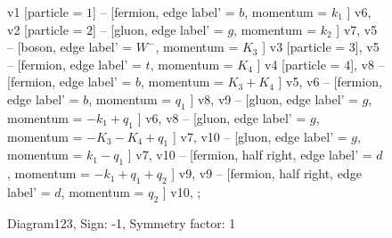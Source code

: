 \documentclass{revtex4}
\begin{document}
\begin{figure}[!htb]
\begin{center}
{    %
v1 [particle = \(1\)] -- [fermion, edge label' = \(b\), momentum = \(k_{1}\) ] v6, 
v2 [particle = \(2\)] -- [gluon, edge label' = \(g\), momentum = \(k_{2}\) ] v7, 
v5 -- [boson, edge label' = \(W^{-}\), momentum = \(K_{3}\) ] v3 [particle = \(3\)], 
v5 -- [fermion, edge label' = \(t\), momentum = \(K_{4}\) ] v4 [particle = \(4\)], 
v8 -- [fermion, edge label' = \(b\), momentum = \(K_{3} + K_{4}\) ] v5, 
v6 -- [fermion, edge label' = \(b\), momentum = \(q_{1}\) ] v8, 
v9 -- [gluon, edge label' = \(g\), momentum = \(-k_{1} + q_{1}\) ] v6, 
v8 -- [gluon, edge label' = \(g\), momentum = \(-K_{3} - K_{4} + q_{1}\) ] v7, 
v10 -- [gluon, edge label' = \(g\), momentum = \(k_{1} - q_{1}\) ] v7, 
v10 -- [fermion, half right, edge label' = \(d\), momentum = \(-k_{1} + q_{1} + q_{2}\) ] v9, 
v9 -- [fermion, half right, edge label' = \(d\), momentum = \(q_{2}\) ] v10, 
};
\end{center}
\caption{Diagram123, Sign: -1, Symmetry factor: 1}
\end{figure}
\newpage
\end{document}
